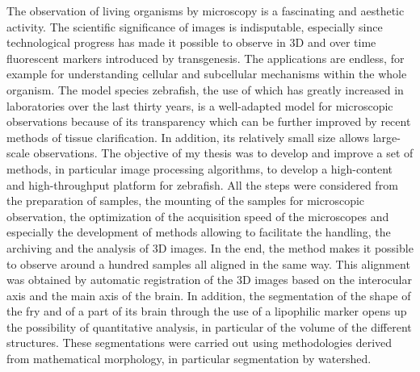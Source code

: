 The observation of living organisms by microscopy is a fascinating and aesthetic activity.
The scientific significance of images is indisputable, especially since technological progress has made it possible to observe in 3D and over time fluorescent markers introduced by transgenesis. The applications are endless, for example for understanding cellular and subcellular mechanisms within the whole organism. The model species zebrafish, the use of which has greatly increased in laboratories over the last thirty years, is a  well-adapted model for microscopic observations because of its transparency which can be further improved by recent methods of tissue clarification. In addition, its relatively small size allows large-scale observations.
The objective of my thesis was to develop and improve a set of methods, in particular image processing algorithms, to develop a high-content and high-throughput platform for zebrafish. All the steps were considered from the preparation of samples, the mounting of the samples for microscopic observation, the optimization of the acquisition speed of the microscopes and especially the development of methods allowing to facilitate the handling, the archiving and the analysis of 3D images. In the end, the method makes it possible to observe around a hundred samples all aligned in the same way.
This alignment was obtained by automatic registration of the 3D images based on the interocular axis and the main axis of the brain.
In addition, the segmentation of the shape of the fry and of a part of its brain through the use of a lipophilic marker opens up the possibility of quantitative analysis, in particular of the volume of the different structures.
These segmentations were carried out using methodologies derived from mathematical morphology, in particular segmentation by watershed.
